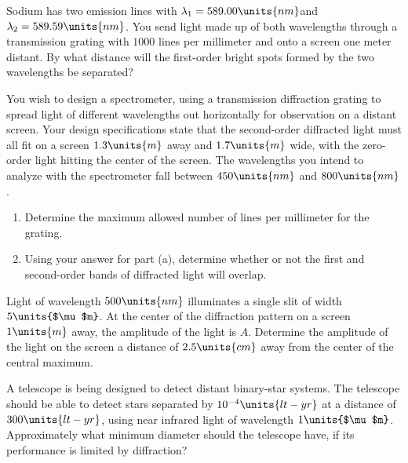 \begin{problem}
 Sodium   has  two   emission   lines  with
  $\lambda_1=589.00\units{nm}$and  $\lambda_2=589.59\units{nm}$.   
You  send light
made up of both wavelengths through a transmission grating with $1000$ lines
per millimeter and onto a screen one meter distant.  By what distance
will the first-order bright spots formed by the two wavelengths be separated?
\end{problem}

\begin{problem}
  You wish  to design a spectrometer, using  a transmission diffraction
  grating to spread light of different wavelengths out horizontally
for observation on a
distant screen.
Your design specifications state  that 
the second-order diffracted light must all fit on a
  screen $1.3\units{m}$  away and $1.7\units{m}$ wide, with the zero-order light hitting
the center of the screen.  The wavelengths  you intend to  analyze with
  the spectrometer fall between $450\units{nm}$ and $800\units{nm}$.
%
\begin{enumerate}

\item Determine the maximum  allowed number of lines per millimeter
for the grating.
\item Using your answer for part (a), determine whether or not  the first and second-order bands of diffracted light will overlap.
\end{enumerate}
\end{problem}

\begin{problem}
Light of wavelength $500\units{nm}$ illuminates a single slit of width
$5\units{$\mu$m}$. At the center of the diffraction pattern on a  screen $1\units{m}$
away, the amplitude of the light is $A$. Determine the amplitude 
of the light
on the screen a distance of $2.5\units{cm}$ away from the center of the central maximum.
\end{problem}




\begin{problem}
  A  telescope  is  being   designed  to  detect  distant  binary-star
  systems. The telescope should be able to detect stars separated by 
   $10^{-4}\units{lt-yr}$ at  a distance of $300\units{lt-yr}$, using
  near  infrared light  of wavelength  $1\units{$\mu$m}$.   Approximately what
minimum  diameter should the telescope have, if its performance is limited
by diffraction?
\end{problem}



